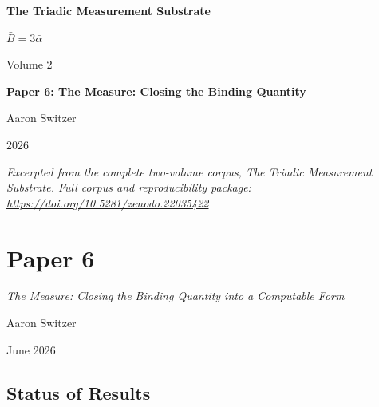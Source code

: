 \documentclass[11pt,oneside]{report}
\theoremstyle{definition}
\theoremstyle{remark}
\begin{document}
\thispagestyle{empty}
\begin{titlepage}
\centering
\vspace*{2cm}
{\sffamily\bfseries\Large The Triadic Measurement Substrate\par}
\vspace{0.6cm}
{\large $\bar{B} = 3\bar{\alpha}$\par}
\vspace{1cm}
{\sffamily\large Volume 2\par}
\vspace{1.4cm}
{\Large \bfseries Paper 6: The Measure: Closing the Binding Quantity\par}
\vfill
{\large Aaron Switzer\par}
\vspace{0.4cm}
{\large 2026\par}
\vspace{1.2cm}
{\small\itshape Excerpted from the complete two-volume corpus, \emph{The Triadic Measurement Substrate}. Full corpus and reproducibility package: \url{https://doi.org/10.5281/zenodo.22035422}\par}
\end{titlepage}
\cleardoublepage
{}

\chapter*{Paper 6}
\begingroup\centering
{\large\itshape The Measure: Closing the Binding Quantity into a Computable Form\par}\vspace{0.8em}
{\normalsize Aaron Switzer\par}
{\small June 2026\par}
\endgroup\vspace{1.0em}

\par\vspace{0.6em}

\section*{Status of Results}
\end{document}
